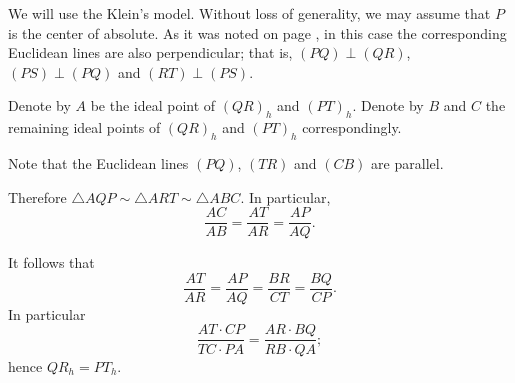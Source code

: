 We will use the Klein's model.
Without loss of generality, we may assume that $P$ is the center of absolute.
As it was noted on page \pageref{klein-angles},
in this case the corresponding Euclidean lines are also perpendicular;
that is, $(PQ)\perp (QR)$, $(PS)\perp(PQ)$ and $(RT)\perp (PS)$.

Denote by $A$ be the ideal point of $(QR)_h$ and $(PT)_h$.
Denote by $B$ and $C$ the remaining ideal points of $(QR)_h$ and $(PT)_h$
correspondingly.

Note that the Euclidean lines $(PQ)$, $(TR)$ and $(CB)$ are parallel.

Therefore $\triangle AQP\sim \triangle ART \sim\triangle ABC$.
In particular,
$$\frac{AC}{AB}=\frac{AT}{AR}=\frac{AP}{AQ}.$$

It follows that
$$\frac{AT}{AR}=\frac{AP}{AQ}=\frac{BR}{CT}=\frac{BQ}{CP}.$$
In particular
$$\frac{AT\cdot CP}{TC\cdot PA}=\frac{AR\cdot BQ}{RB\cdot QA};$$
hence $QR_h=PT_h$.
\qeds
 

